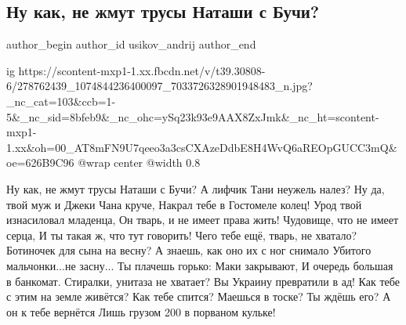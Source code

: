  
 
 
 
 
 
\subsection{Ну как, не жмут трусы Наташи с Бучи?}
\label{sec:25_04_2022.fb.usikov_andrij.1.trusy_natashi_s_buchi}
 
\ifcmt
 author_begin
   author_id usikov_andrij
 author_end
\fi

\ifcmt
  ig https://scontent-mxp1-1.xx.fbcdn.net/v/t39.30808-6/278762439_1074844236400097_7033726328901948483_n.jpg?_nc_cat=103&ccb=1-5&_nc_sid=8bfeb9&_nc_ohc=ySq23k93e9AAX8ZxJmk&_nc_ht=scontent-mxp1-1.xx&oh=00_AT8mFN9U7qeeo3a3csCXAzeDdbE8H4WvQ6aREOpGUCC3mQ&oe=626B9C96
  @wrap center
  @width 0.8
\fi

\raggedcolumns
\begin{multicols}{2} %
\setlength{\parindent}{0pt}

\obeycr
Ну как, не жмут трусы Наташи с Бучи?
А лифчик Тани неужель налез?
Ну да, твой муж и Джеки Чана круче,
Накрал тебе в Гостомеле колец!
\smallskip
Урод твой изнасиловал младенца,
Он тварь, и не имеет права жить!
Чудовище, что не имеет серца,
И ты такая ж, что тут говорить!
\smallskip
Чего тебе ещё, тварь, не хватало?
Ботиночек для сына на весну?
А знаешь, как оно их с ног снимало
Убитого мальчонки...не засну...
\smallskip
Ты плачешь горько: Маки закрывают,
И очередь большая в банкомат.
Стиралки, унитаза не хватает?
Вы Украину превратили в ад!
\smallskip
Как тебе с этим на земле живётся?
Как тебе спится? Маешься в тоске?
Ты ждёшь его? А он к тебе вернётся
Лишь грузом 200 в порваном кульке!
\restorecr
\end{multicols} %
